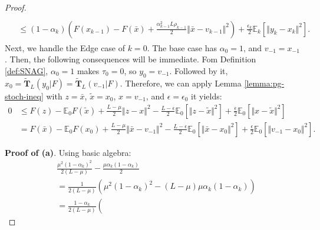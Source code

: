 \documentclass[12pt]{article}
\newcommand{\expect}{\ensuremath{\mathbb E}}
\begin{document}
\begin{proof}
\begin{align}
\begin{split}
                \\
                &\le 
                (1 - \alpha_k)\left(
                    F(x_{k - 1}) - F(\bar x)
                    + \frac{\alpha_{k - 1}^2L\rho_{k - 1}}{2}\Vert \bar x - v_{k - 1}\Vert^2
                \right) + \frac{\epsilon_k}{2}\expect_k \left[\Vert y_k - x_k \Vert^2\right]. 
            \end{split}\end{align}
            Next, we handle the Edge case of $k = 0$. 
            The base case has $\alpha_0 = 1$, and $v_{-1} = x_{-1}$. 
            Then, the following consequences will be immediate. 
            Fom Definition \ref{def:SNAG}, $\alpha_0 = 1$ makes $\tau_0 = 0$, so $y_0 = v_{-1}$. 
            Followed by it, $x_0 = \tilde {\mathbf T}_L(y_0 | F) = \widetilde{\mathbf T}_L(v_{-1} | F)$. 
            Therefore, we can apply Lemma \ref{lemma:pg-stoch-ineq} with $z = \bar x$, $\tilde x = x_0$, $x = v_{-1}$, and $\epsilon = \epsilon_0$ it yields: 
            {\small
            \begin{align*}
                0
                &\le 
                F(z) - \expect_0 F(\tilde x)
                + \frac{L - \mu}{2} \Vert z - x\Vert^2
                - \frac{L - \epsilon}{2}\expect_0\left[\Vert z - \tilde x\Vert^2\right]
                + \frac{\epsilon}{2} \expect_0\left[\Vert x - \tilde x\Vert^2\right]
                \\
                &= 
                F(\bar x) - \expect_0 F(x_0)
                + \frac{L - \mu}{2} \Vert \bar x - v_{-1}\Vert^2
                - \frac{L - \epsilon}{2}\expect_0\left[\Vert \bar x - x_0\Vert^2\right]
                + \frac{\epsilon}{2}\expect_0\left[\Vert v_{-1} - x_0\Vert^2\right].
            \end{align*}
            }
            \par \textbf{Proof of (a)}. 
            Using basic algebra: 
            {\allowdisplaybreaks
            \begin{align*}
                & \frac{\mu^2(1 - \alpha_k)^2}{2(L - \mu)} 
                - \frac{\mu\alpha_k(1 - \alpha_k)}{2}
                \\
                &= 
                \frac{1}{2\left(L - \mu\right)}
                \left(
                    \mu^2(1 - \alpha_k)^2
                    - \left(L - \mu\right)\mu \alpha_k(1 - \alpha_k)
                \right)
                \\
                &= \frac{1 - \alpha_k}{2\left(L - \mu\right)}\left(

\end{align*}}
\end{proof}
\end{document}
